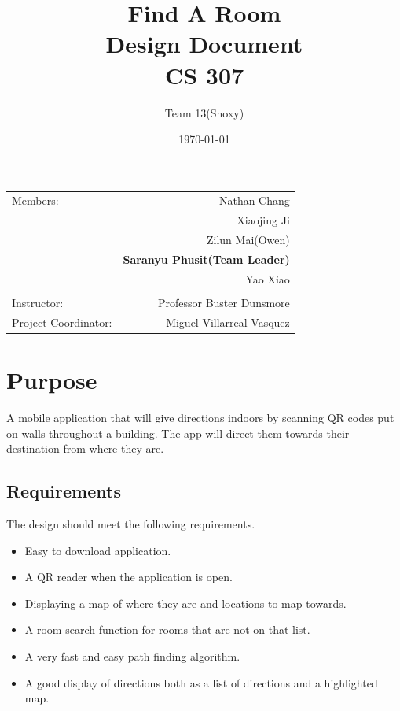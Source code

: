 \documentclass[12pt]{article}
\title{\textbf{Find A Room} \\ Design Document \\ CS 307} %
\author{Team \textsc{13}(Snoxy)} %
\date{\today} %
\begin{document}
\maketitle %

\begin{center}
\begin{tabular}{l r}
Members: & Nathan Chang \\ %
& Xiaojing Ji \\
& Zilun Mai(Owen) \\
& \textbf{Saranyu Phusit(Team Leader)} \\
& Yao Xiao \\
\\
\bigskip
Instructor: & Professor Buster Dunsmore \\%
Project Coordinator: & Miguel Villarreal-Vasquez %

\end{tabular}
\end{center}

\newpage
\tableofcontents




\newpage
\section{Purpose}

A mobile application that will give directions indoors by scanning QR codes put on walls throughout a building. The app will direct them towards their destination from where they are.

\subsection{Requirements}
The design should meet the following requirements.

\begin{itemize}
\item Easy to download application. 
\item A QR reader when the application is open.
\item Displaying a map of where they are and locations to map towards.
\item A room search function for rooms that are not on that list.
\item A very fast and easy path finding algorithm.
\item A good display of directions both as a list of directions and a highlighted map.


\end{itemize}
\end{document}
